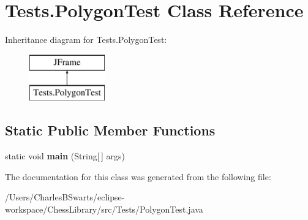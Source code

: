 \hypertarget{class_tests_1_1_polygon_test}{}\section{Tests.\+Polygon\+Test Class Reference}
\label{class_tests_1_1_polygon_test}
Inheritance diagram for Tests.\+Polygon\+Test\+:\begin{figure}[H]
\begin{center}
\leavevmode
\includegraphics[height=2.000000cm]{class_tests_1_1_polygon_test}
\end{center}
\end{figure}
\subsection*{Static Public Member Functions}
\begin{DoxyCompactItemize}
\item 
\mbox{\label{class_tests_1_1_polygon_test_ad0ef742c61990ffafc1f172fed737761}} 
static void {\bfseries main} (String\mbox{[}$\,$\mbox{]} args)
\end{DoxyCompactItemize}


The documentation for this class was generated from the following file\+:\begin{DoxyCompactItemize}
\item 
/\+Users/\+Charles\+B\+Swarts/eclipse-\/workspace/\+Chess\+Library/src/\+Tests/Polygon\+Test.\+java\end{DoxyCompactItemize}
